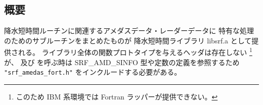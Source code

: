 \subsection{概要}

降水短時間ルーチンに関連するアメダスデータ・レーダーデータに
特有な処理のためのサブルーチンをまとめたものが
降水短時間ライブラリ libsrf.a として提供される。
ライブラリ全体の関数プロトタイプを与えるヘッダは存在しない%
\footnote{このため IBM 系環境では Fortran ラッパーが提供できない。}が、
 及び
 を呼ぶ時は
SRF\_AMD\_SINFO 型や定数の定義を参照するため
\verb|"srf_amedas_fort.h"| をインクルードする必要がある。









